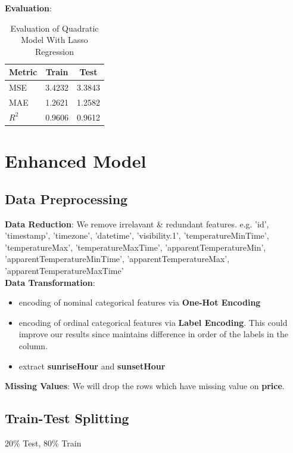 \documentclass[a4paper,12pt]{article}
\begin{document}
\noindent\textbf{Evaluation}: 
\begin{table}[H]
    \centering
    \begin{tabular}{|l|c|c|}
    \hline
    \textbf{Metric} & \textbf{Train} & \textbf{Test} \\
    \hline
    MSE & 3.4232 & 3.3843 \\
    MAE & 1.2621 & 1.2582 \\
    $R^2$ & 0.9606 & 0.9612 \\
    \hline
    \end{tabular}
    \caption{Evaluation of Quadratic Model With Lasso Regression}
    \label{tab:tab_8}
\end{table}

\section*{Enhanced Model}

\subsection*{Data Preprocessing}

\textbf{Data Reduction}: We remove irrelavant \& redundant features. e.g. 'id', 'timestamp', 'timezone', 'datetime', 'visibility.1',
'temperatureMinTime', 'temperatureMax', 'temperatureMaxTime',
'apparentTemperatureMin', 'apparentTemperatureMinTime',
'apparentTemperatureMax', 'apparentTemperatureMaxTime' \\

\noindent\textbf{Data Transformation}: 
\begin{itemize}
    \item encoding of nominal categorical features via \textbf{One-Hot Encoding}
    \item encoding of ordinal categorical features via \textbf{Label Encoding}. This could improve our results since maintains difference in order of the labels in the column.
    \item extract \textbf{sunriseHour} and \textbf{sunsetHour}
\end{itemize}

\noindent\textbf{Missing Values}: We will drop the rows which have missing value on \textbf{price}.

\subsection*{Train-Test Splitting}
20\% Test, 80\% Train
\end{document}
